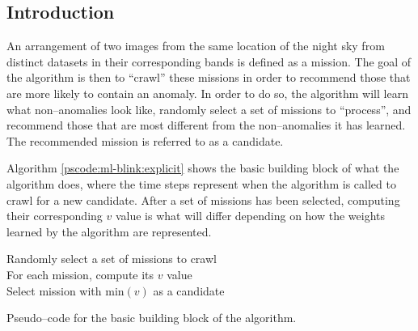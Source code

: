 \subsection{Introduction} \label{subsect:meth:intro}

An arrangement of two images from the same location of the night sky from distinct datasets in their corresponding bands is defined as a mission. The goal of the \mlblink algorithm is then to ``crawl'' these missions in order to recommend those that are more likely to contain an anomaly. In order to do so, the \mlblink algorithm will learn what non--anomalies look like, randomly select a set of missions to ``process'', and recommend those that are most different from the non--anomalies it has learned. The recommended mission is referred to as a candidate.

Algorithm \ref{pscode:ml-blink:explicit} shows the basic building block of what the \mlblink algorithm does, where the time steps represent when the algorithm is called to crawl for a new candidate. After a set of missions has been selected, computing their corresponding $v$ value is what will differ depending on how the weights learned by the algorithm are represented.

\begin{algorithm}[H]
    \SetAlgoLined
        \FMain{} {
             {
                Randomly select a set of missions to crawl \\
                For each mission, compute its $v$ value \\
                Select mission with $\text{min}(v)$ as a candidate \\
            }
        }
    \caption{Pseudo--code for the basic building block of the \mlblink algorithm.}
    \label{pscode:ml-blink:explicit}
\end{algorithm}
